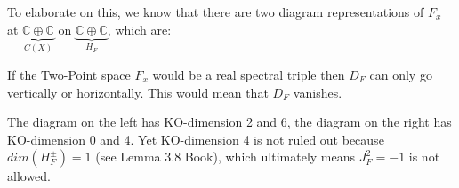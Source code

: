     To elaborate on this, we know that there are two diagram representations of
    $F_x$ at $\underbrace{\mathbb{C} \oplus \mathbb{C}}_{C(X)}$ on
    $\underbrace{\mathbb{C} \oplus\mathbb{C}}_{H_F}$, which are:
    \begin{figure}[h!] \centering
    \end{figure}\newline
If the Two-Point space $F_x$ would be a real spectral triple then $D_F$ can
only go vertically or horizontally. This would mean that $D_F$ vanishes.

The diagram on the left has KO-dimension 2 and 6, the diagram on the
right has KO-dimension 0 and 4. Yet KO-dimension 4 is not ruled out because
$dim(H_F^\pm) = 1$ (see Lemma 3.8 Book), which ultimately means $J_F^2 = -1$ is
not allowed.
